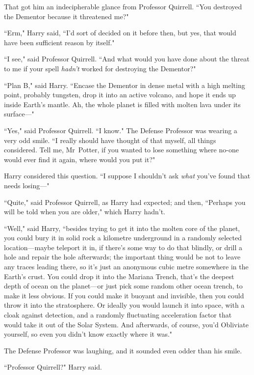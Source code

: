 That got him an indecipherable glance from Professor Quirrell. ``You destroyed the Dementor because it threatened me?"

``Erm," Harry said, ``I'd sort of decided on it before then, but yes, that would have been sufficient reason by itself."

``I see," said Professor Quirrell. ``And what would you have done about the threat to me if your spell \emph{hadn't} worked for destroying the Dementor?"

``Plan B," said Harry. ``Encase the Dementor in dense metal with a high melting point, probably tungsten, drop it into an active volcano, and hope it ends up inside Earth's mantle. Ah, the whole planet is filled with molten lava under its surface—"

``Yes," said Professor Quirrell. ``I know." The Defense Professor was wearing a very odd smile. ``I really should have thought of that myself, all things considered. Tell me, Mr~Potter, if you wanted to lose something where no-one would ever find it again, where would you put it?"

Harry considered this question. ``I suppose I shouldn't ask \emph{what} you've found that needs losing—"

``Quite," said Professor Quirrell, as Harry had expected; and then, ``Perhaps you will be told when you are older," which Harry hadn't.

``Well," said Harry, ``besides trying to get it into the molten core of the planet, you could bury it in solid rock a kilometre underground in a randomly selected location—maybe teleport it in, if there's some way to do that blindly, or drill a hole and repair the hole afterwards; the important thing would be not to leave any traces leading there, so it's just an anonymous cubic metre somewhere in the Earth's crust. You could drop it into the Mariana Trench, that's the deepest depth of ocean on the planet—or just pick some random other ocean trench, to make it less obvious. If you could make it buoyant and invisible, then you could throw it into the stratosphere. Or ideally you would launch it into space, with a cloak against detection, and a randomly fluctuating acceleration factor that would take it out of the Solar System. And afterwards, of course, you'd Obliviate yourself, so even you didn't know exactly where it was."

The Defense Professor was laughing, and it sounded even odder than his smile.

``Professor Quirrell?" Harry said.


